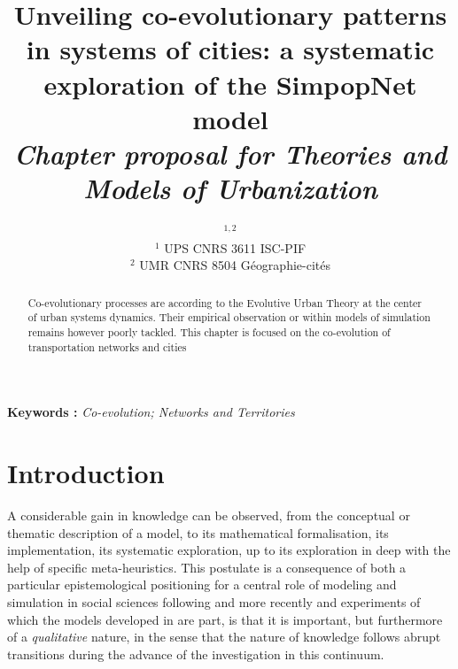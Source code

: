 


\title{Unveiling co-evolutionary patterns in systems of cities: a systematic exploration of the SimpopNet model
\\\medskip
\textit{Chapter proposal for Theories and Models of Urbanization}
}
\author{$^{1,2}$\\
$^1$ UPS CNRS 3611 ISC-PIF\\
$^2$ UMR CNRS 8504 G{\'e}ographie-cit{\'e}s
}
\date{}

\maketitle

\justify



\begin{abstract}
Co-evolutionary processes are according to the Evolutive Urban Theory at the center of urban systems dynamics. Their empirical observation or within models of simulation remains however poorly tackled. This chapter is focused on the co-evolution of transportation networks and cities
\end{abstract}

\textbf{Keywords : }\textit{Co-evolution; Networks and Territories}




\section{Introduction}


A considerable gain in knowledge can be observed, from the conceptual or thematic description of a model, to its mathematical formalisation, its implementation, its systematic exploration, up to its exploration in deep with the help of specific meta-heuristics. This postulate is a consequence of both a particular epistemological positioning for a central role of modeling and simulation in social sciences following \cite{banos2013pour} and more recently \cite{raimbault:tel-01857741} and experiments of which the models developed in \cite{raimbault:tel-01857741} are part, is that it is important, but furthermore of a \emph{qualitative} nature, in the sense that the nature of knowledge follows abrupt transitions during the advance of the investigation in this continuum.


